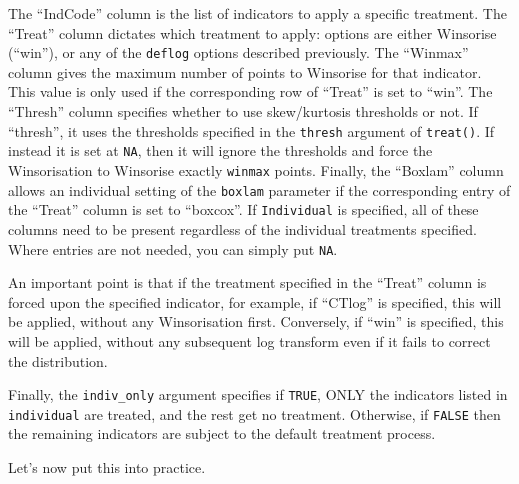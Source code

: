 \documentclass[
]{book}
\begin{document}
The ``IndCode'' column is the list of indicators to apply a specific treatment. The ``Treat'' column dictates which treatment to apply: options are either Winsorise (``win''), or any of the \texttt{deflog} options described previously. The ``Winmax'' column gives the maximum number of points to Winsorise for that indicator. This value is only used if the corresponding row of ``Treat'' is set to ``win''. The ``Thresh'' column specifies whether to use skew/kurtosis thresholds or not. If ``thresh'', it uses the thresholds specified in the \texttt{thresh} argument of \texttt{treat()}. If instead it is set at \texttt{NA}, then it will ignore the thresholds and force the Winsorisation to Winsorise exactly \texttt{winmax} points. Finally, the ``Boxlam'' column allows an individual setting of the \texttt{boxlam} parameter if the corresponding entry of the ``Treat'' column is set to ``boxcox''. If \texttt{Individual} is specified, all of these columns need to be present regardless of the individual treatments specified. Where entries are not needed, you can simply put \texttt{NA}.

An important point is that if the treatment specified in the ``Treat'' column is forced upon the specified indicator, for example, if ``CTlog'' is specified, this will be applied, without any Winsorisation first. Conversely, if ``win'' is specified, this will be applied, without any subsequent log transform even if it fails to correct the distribution.

Finally, the \texttt{indiv\_only} argument specifies if \texttt{TRUE}, ONLY the indicators listed in \texttt{individual} are treated, and the rest get no treatment. Otherwise, if \texttt{FALSE} then the remaining indicators are subject to the default treatment process.

Let's now put this into practice.
\end{document}
